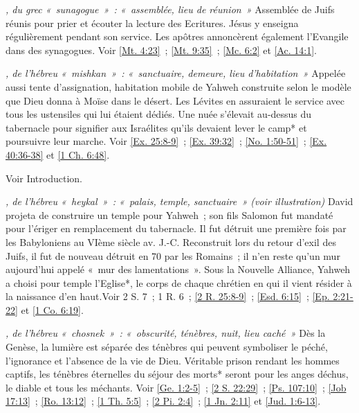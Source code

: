 \begin{multicols}{2}
\textit{, du grec «~sunagogue~»~: «~assemblée, lieu de réunion~»}\newline
Assemblée de Juifs réunis pour prier et écouter la lecture des Ecritures. Jésus y enseigna régulièrement pendant son service. Les apôtres annoncèrent également l'Evangile dans des synagogues. Voir \vref{Mt. 4:23}~; \vref{Mt. 9:35}~; \vref{Mc. 6:2} et \vref{Ac. 14:1}.

\textit{, de l'hébreu «~mishkan~»~: «~sanctuaire, demeure, lieu d'habitation~»}\newline
Appelée aussi tente d'assignation, habitation mobile de Yahweh construite selon le modèle que Dieu donna à Moïse dans le désert. Les Lévites en assuraient le service avec tous les ustensiles qui lui étaient dédiés. Une nuée s'élevait au-dessus du tabernacle pour signifier aux Israélites qu'ils devaient lever le camp* et poursuivre leur marche. Voir \vref{Ex. 25:8-9}~; \vref{Ex. 39:32}~; \vref{No. 1:50-51}~; \vref{Ex. 40:36-38} et \vref{1 Ch. 6:48}.

\textit{}\newline
Voir Introduction.

\textit{, de l'hébreu «~heykal~»~: «~palais, temple, sanctuaire~» (voir illustration)}\newline
David projeta de construire un temple pour Yahweh~; son fils Salomon fut mandaté pour l'ériger en remplacement du tabernacle. Il fut détruit une première fois par les Babyloniens au VIème siècle av. J.-C. Reconstruit lors du retour d'exil des Juifs, il fut de nouveau détruit en 70 par les Romains~; il n'en reste qu'un mur aujourd'hui appelé «~mur des lamentations~». Sous la Nouvelle Alliance, Yahweh a choisi pour temple l'Eglise*, le corps de chaque chrétien en qui il vient résider à la naissance d'en haut.Voir 2 S. 7~; 1 R. 6~; \vref{2 R. 25:8-9}~; \vref{Esd. 6:15}~; \vref{Ep. 2:21-22} et \vref{1 Co. 6:19}.

\textit{, de l'hébreu «~chosnek~»~: «~obscurité, ténèbres, nuit, lieu caché~»}\newline
Dès la Genèse, la lumière est séparée des ténèbres qui peuvent symboliser le péché, l'ignorance et l'absence de la vie de Dieu. Véritable prison rendant les hommes captifs, les ténèbres éternelles du séjour des morts* seront pour les anges déchus, le diable et tous les méchants. Voir \vref{Ge. 1:2-5}~; \vref{2 S. 22:29}~; \vref{Ps. 107:10}~; \vref{Job 17:13}~; \vref{Ro. 13:12}~; \vref{1 Th. 5:5}~; \vref{2 Pi. 2:4}~; \vref{1 Jn. 2:11} et \vref{Jud. 1:6-13}.


\end{multicols}
